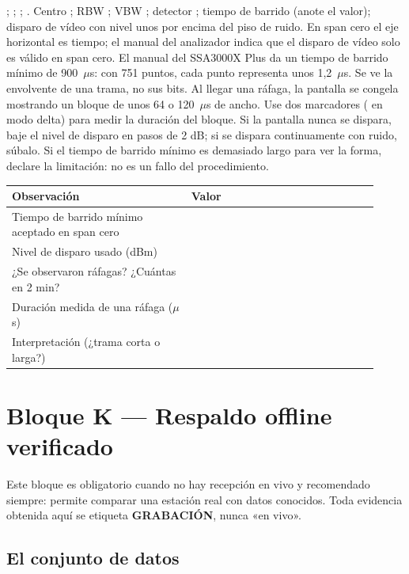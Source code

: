 {; ; ; .}
{Centro ; RBW ; VBW ; detector ; tiempo de barrido  (anote el valor); disparo de vídeo con nivel unos  por encima del piso de ruido.}
{En span cero el eje horizontal es tiempo; el manual del analizador indica que el disparo de vídeo solo es válido en span cero. El manual del SSA3000X Plus da un tiempo de barrido mínimo de 900~$\mu$s: con 751 puntos, cada punto representa unos 1,2~$\mu$s. Se ve la envolvente de una trama, no sus bits.}
{Al llegar una ráfaga, la pantalla se congela mostrando un bloque de unos 64 o 120~$\mu$s de ancho.}
{Use dos marcadores ( en modo delta) para medir la duración del bloque.}
{Si la pantalla nunca se dispara, baje el nivel de disparo en pasos de 2 dB; si se dispara continuamente con ruido, súbalo. Si el tiempo de barrido mínimo es demasiado largo para ver la forma, declare la limitación: no es un fallo del procedimiento.}

\begin{longtable}{@{}p{0.45\linewidth}p{0.47\linewidth}@{}}
\toprule
\textbf{Observación} & \textbf{Valor} \\
\midrule
\endhead
Tiempo de barrido mínimo aceptado en span cero & \\
Nivel de disparo usado (dBm) & \\
¿Se observaron ráfagas? ¿Cuántas en 2 min? & \\
Duración medida de una ráfaga ($\mu$s) & \\
Interpretación (¿trama corta o larga?) & \\
\bottomrule
\end{longtable}

\section{Bloque K --- Respaldo offline verificado}
\label{sec:u-offline}

Este bloque es obligatorio cuando no hay recepción en vivo y recomendado siempre: permite comparar una estación real con datos conocidos. Toda evidencia obtenida aquí se etiqueta \textbf{GRABACIÓN}, nunca «en vivo».

\subsection{El conjunto de datos}

